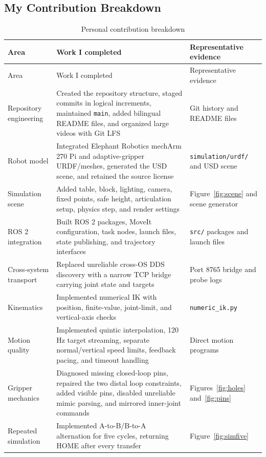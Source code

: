 \documentclass[UTF8,zihao=-4,scheme=chinese,fontset=none]{ctexart}
\begin{document}
\subsection{My Contribution Breakdown}

\begingroup\small
\begin{longtable}{p{2.9cm}p{7.1cm}p{2.9cm}}
\caption{Personal contribution breakdown}\label{tab:contrib}\\
\toprule Area & Work I completed & Representative evidence\\
\midrule\endfirsthead
\toprule Area & Work I completed & Representative evidence\\
\midrule\endhead
Repository engineering & Created the repository structure, staged commits in logical increments, maintained \texttt{main}, added bilingual README files, and organized large videos with Git LFS & Git history and README files\\
Robot model & Integrated Elephant Robotics mechArm 270 Pi and adaptive-gripper URDF/meshes, generated the USD scene, and retained the source license & \texttt{simulation/urdf/} and USD scene\\
Simulation scene & Added table, block, lighting, camera, fixed points, safe height, articulation setup, physics step, and render settings & Figure~\ref{fig:scene} and scene generator\\
ROS 2 integration & Built ROS 2 packages, MoveIt configuration, task nodes, launch files, state publishing, and trajectory interfaces & \texttt{src/} packages and launch files\\
Cross-system transport & Replaced unreliable cross-OS DDS discovery with a narrow TCP bridge carrying joint state and targets & Port 8765 bridge and probe logs\\
Kinematics & Implemented numerical IK with position, finite-value, joint-limit, and vertical-axis checks & \texttt{numeric\_ik.py}\\
Motion quality & Implemented quintic interpolation, 120 Hz target streaming, separate normal/vertical speed limits, feedback pacing, and timeout handling & Direct motion programs\\
Gripper mechanics & Diagnosed missing closed-loop pins, repaired the two distal loop constraints, added visible pins, disabled unreliable mimic parsing, and mirrored inner-joint commands & Figures~\ref{fig:holes} and~\ref{fig:pins}\\
Repeated simulation & Implemented A-to-B/B-to-A alternation for five cycles, returning HOME after every transfer & Figure~\ref{fig:simfive}\\

\end{longtable}
\end{document}
